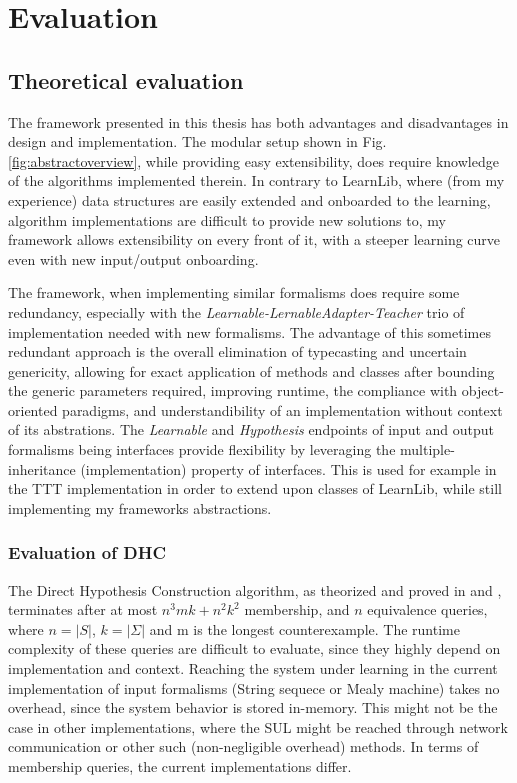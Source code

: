 \chapter{Evaluation}

\section{Theoretical evaluation}

The framework presented in this thesis has both advantages and disadvantages in design and implementation. The modular setup shown in Fig. \ref{fig:abstractoverview}, while providing easy extensibility, does require knowledge of the algorithms implemented therein. In contrary to LearnLib, where (from my experience) data structures are easily extended and onboarded to the learning, algorithm implementations are difficult to provide new solutions to, my framework allows extensibility on every front of it, with a steeper learning curve even with new input/output onboarding.

The framework, when implementing similar formalisms does require some redundancy, especially with the \emph{Learnable-LernableAdapter-Teacher} trio of implementation needed with new formalisms. The advantage of this sometimes redundant approach is the overall elimination of typecasting and uncertain genericity, allowing for exact application of methods and classes after bounding the generic parameters required, improving runtime, the compliance with object-oriented paradigms, and understandibility of an implementation without context of its abstrations. The \emph{Learnable} and \emph{Hypothesis} endpoints of input and output formalisms being interfaces provide flexibility by leveraging the multiple-inheritance (implementation) property of interfaces. This is used for example in the TTT implementation in order to extend upon classes of LearnLib, while still implementing my frameworks abstractions.

\subsection{Evaluation of DHC}

The Direct Hypothesis Construction algorithm, as theorized and proved in \cite{Steffen2011} and \cite{10.1007/978-3-642-34781-8_19}, terminates after at most $n^3mk+n^2k^2$ membership, and $n$ equivalence queries, where $n=|S|$, $k=|\Sigma|$ and m is the longest counterexample. The runtime complexity of these queries are difficult to evaluate, since they highly depend on implementation and context. Reaching the system under learning in the current implementation of input formalisms (String sequece or Mealy machine) takes no overhead, since the system behavior is stored in-memory. This might not be the case in other implementations, where the SUL might be reached through network communication or other such (non-negligible overhead) methods. In terms of membership queries, the current implementations differ. 

